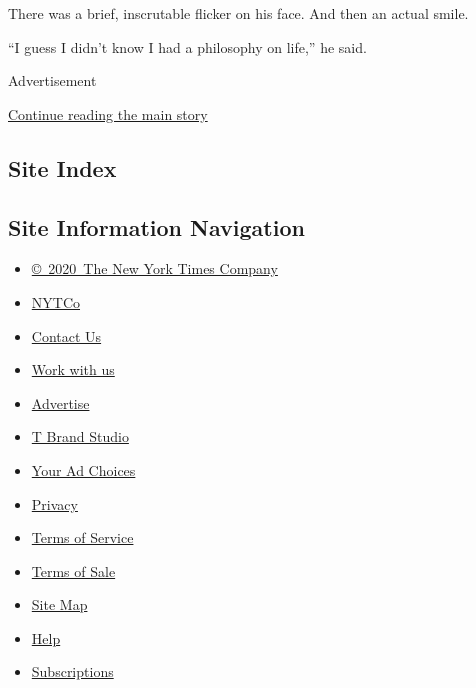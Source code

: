 There was a brief, inscrutable flicker on his face. And then an actual
smile.

``I guess I didn't know I had a philosophy on life,'' he said.

Advertisement

\protect\hyperlink{after-bottom}{Continue reading the main story}

\hypertarget{site-index}{%
\subsection{Site Index}\label{site-index}}

\hypertarget{site-information-navigation}{%
\subsection{Site Information
Navigation}\label{site-information-navigation}}

\begin{itemize}
\tightlist
\item
  \href{https://help.nytimes3xbfgragh.onion/hc/en-us/articles/115014792127-Copyright-notice}{©~2020~The
  New York Times Company}
\end{itemize}

\begin{itemize}
\tightlist
\item
  \href{https://www.nytco.com/}{NYTCo}
\item
  \href{https://help.nytimes3xbfgragh.onion/hc/en-us/articles/115015385887-Contact-Us}{Contact
  Us}
\item
  \href{https://www.nytco.com/careers/}{Work with us}
\item
  \href{https://nytmediakit.com/}{Advertise}
\item
  \href{http://www.tbrandstudio.com/}{T Brand Studio}
\item
  \href{https://www.nytimes3xbfgragh.onion/privacy/cookie-policy\#how-do-i-manage-trackers}{Your
  Ad Choices}
\item
  \href{https://www.nytimes3xbfgragh.onion/privacy}{Privacy}
\item
  \href{https://help.nytimes3xbfgragh.onion/hc/en-us/articles/115014893428-Terms-of-service}{Terms
  of Service}
\item
  \href{https://help.nytimes3xbfgragh.onion/hc/en-us/articles/115014893968-Terms-of-sale}{Terms
  of Sale}
\item
  \href{https://spiderbites.nytimes3xbfgragh.onion}{Site Map}
\item
  \href{https://help.nytimes3xbfgragh.onion/hc/en-us}{Help}
\item
  \href{https://www.nytimes3xbfgragh.onion/subscription?campaignId=37WXW}{Subscriptions}
\end{itemize}
